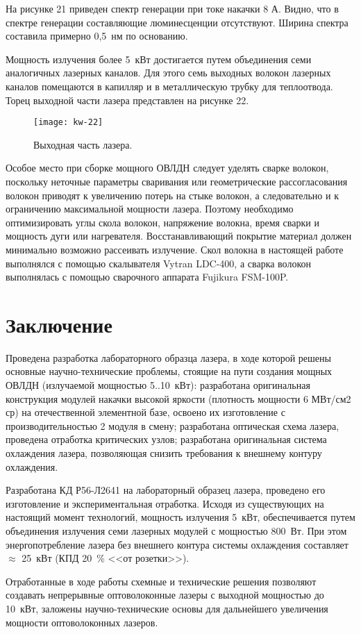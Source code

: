 На рисунке 21 приведен спектр генерации при токе накачки 8 А. Видно, что в спектре генерации составляющие люминесценции отсутствуют. Ширина спектра составила примерно 0,5~нм по основанию.

Мощность излучения более 5~кВт достигается путем объединения семи аналогичных лазерных каналов. Для этого семь выходных волокон лазерных каналов помещаются в капилляр и в металлическую трубку для теплоотвода. Торец выходной части лазера представлен на рисунке 22.
\begin{figure}
  \centering
  \texttt{[image: kw-22]}
  \caption{Выходная часть лазера.}
  \label{img:kw-22}
\end{figure}

Особое место при сборке мощного ОВЛДН следует уделять сварке волокон, поскольку неточные параметры сваривания или геометрические рассогласования волокон приводят к увеличению потерь на стыке волокон, а следовательно и к ограничению максимальной мощности лазера. Поэтому необходимо оптимизировать углы скола волокон, напряжение волокна, время сварки и мощность дуги или нагревателя. Восстанавливающий покрытие материал должен минимально возможно рассеивать излучение.
Скол волокна в настоящей работе выполнялся с помощью скалывателя Vytran LDC-400, а сварка волокон выполнялась с помощью сварочного аппарата Fujikura FSM-100P.

\section{Заключение}
\label{sec:kw-conclusion}

Проведена разработка лабораторного образца лазера, в ходе которой решены основные научно-технические проблемы, стоящие на пути создания мощных ОВЛДН (излучаемой мощностью 5..10~кВт): разработана оригинальная конструкция модулей накачки высокой яркости (плотность мощности 6 МВт/см2 ср) на отечественной элементной базе, освоено их изготовление с производительностью 2 модуля в смену; разработана оптическая схема лазера, проведена отработка критических узлов; разработана оригинальная система охлаждения лазера, позволяющая снизить требования к внешнему контуру охлаждения.

Разработана КД Р56-Л2641 на лабораторный образец лазера, проведено его изготовление и экспериментальная отработка. Исходя из существующих на настоящий момент технологий, мощность излучения 5~кВт, обеспечивается путем объединения излучения семи лазерных модулей с мощностью 800~Вт. При этом энергопотребление лазера без внешнего контура системы охлаждения составляет $\approx$ 25~кВт (КПД 20~\% <<от розетки>>).

Отработанные в ходе работы схемные и технические решения позволяют создавать непрерывные оптоволоконные лазеры с выходной мощностью до 10~кВт, заложены научно-технические основы для дальнейшего увеличения мощности оптоволоконных лазеров.


\clearpage
